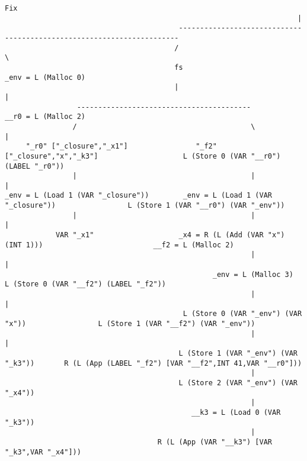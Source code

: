 \begin{landscape}
\begin{lstlisting}[basicstyle=\fontsize{9}{10}\selectfont\ttfamily]
                                                                    Fix
                                                                     |
                                         ----------------------------------------------------------------------
                                        /                                                                      \
                                        fs                                                            _env = L (Malloc 0)
                                        |                                                                      |
                 -----------------------------------------                                            __r0 = L (Malloc 2)
                /                                         \                                                    |
     "_r0" ["_closure","_x1"]                "_f2" ["_closure","x","_k3"]                    L (Store 0 (VAR "__r0") (LABEL "_r0"))
                |                                         |                                                    |
_env = L (Load 1 (VAR "_closure"))        _env = L (Load 1 (VAR "_closure"))                 L (Store 1 (VAR "__r0") (VAR "_env"))
                |                                         |                                                    |
            VAR "_x1"                    _x4 = R (L (Add (VAR "x") (INT 1)))                          __f2 = L (Malloc 2)
                                                          |                                                    |
                                                 _env = L (Malloc 3)                         L (Store 0 (VAR "__f2") (LABEL "_f2"))
                                                          |                                                    |
                                          L (Store 0 (VAR "_env") (VAR "x"))                 L (Store 1 (VAR "__f2") (VAR "_env"))
                                                          |                                                    |
                                         L (Store 1 (VAR "_env") (VAR "_k3"))       R (L (App (LABEL "_f2") [VAR "__f2",INT 41,VAR "__r0"]))
                                                          |
                                         L (Store 2 (VAR "_env") (VAR "_x4"))
                                                          |
                                            __k3 = L (Load 0 (VAR "_k3"))
                                                          |
                                    R (L (App (VAR "__k3") [VAR "_k3",VAR "_x4"]))

\end{lstlisting}
\end{landscape}
\clearpage

